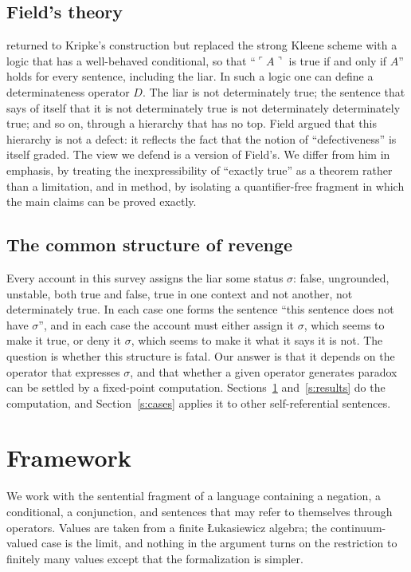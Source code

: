 \documentclass{situationist-preprint}
\begin{document}
\subsection{Field's theory}

\citet{Field2003,Field2008} returned to Kripke's construction but replaced the strong Kleene scheme with a logic that has a well-behaved conditional, so that \enquote{$\ulcorner A\urcorner$ is true if and only if $A$} holds for every sentence, including the liar. In such a logic one can define a determinateness operator $D$. The liar is not determinately true; the sentence that says of itself that it is not determinately true is not determinately determinately true; and so on, through a hierarchy that has no top. Field argued that this hierarchy is not a defect: it reflects the fact that the notion of \enquote{defectiveness} is itself graded. The view we defend is a version of Field's. We differ from him in emphasis, by treating the inexpressibility of \enquote{exactly true} as a theorem rather than a limitation, and in method, by isolating a quantifier-free fragment in which the main claims can be proved exactly.

\subsection{The common structure of revenge}

Every account in this survey assigns the liar some status $\sigma$: false, ungrounded, unstable, both true and false, true in one context and not another, not determinately true. In each case one forms the sentence \enquote{this sentence does not have $\sigma$}, and in each case the account must either assign it $\sigma$, which seems to make it true, or deny it $\sigma$, which seems to make it what it says it is not. The question is whether this structure is fatal. Our answer is that it depends on the operator that expresses $\sigma$, and that whether a given operator generates paradox can be settled by a fixed-point computation. Sections~\ref{s:frame} and~\ref{s:results} do the computation, and Section~\ref{s:cases} applies it to other self-referential sentences.

\section{Framework}\label{s:frame}

We work with the sentential fragment of a language containing a negation, a conditional, a conjunction, and sentences that may refer to themselves through operators. Values are taken from a finite Łukasiewicz algebra; the continuum-valued case is the limit, and nothing in the argument turns on the restriction to finitely many values except that the formalization is simpler.
\end{document}
